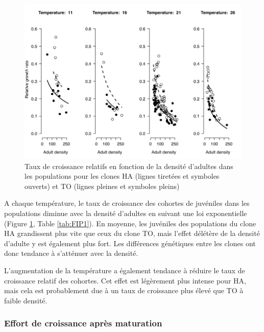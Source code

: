 \begin{figure}[!ht]
\begin{center}
\includegraphics[width=\textwidth]{1_CorpsDeThese/Resumes/Fig/FIP04}
\caption[Taux de croissance
relatifs]{Taux de croissance relatifs en fonction de la densité d'adultes dans
les populations pour les clones HA (lignes tiretées et symboles ouverts) et TO
(lignes pleines et symboles pleins)}
\label{fig:FIP4}
\end{center}
\end{figure}

A chaque température, le taux de croissance des cohortes de juvéniles dans les
populations diminue avec la densité d'adultes en suivant une loi exponentielle
(Figure \ref{fig:FIP4}, Table \ref{tab:FIP1}). En moyenne, les juvéniles des
populations du clone HA grandissent plus vite que ceux du clone TO, mais l'effet
délétère de la densité d'adulte y est également plus fort. Les différences
génétiques entre les clones ont donc tendance à s'atténuer avec la densité. 

L'augmentation de la température a également tendance à réduire le taux de
croissance relatif des cohortes. Cet effet est légèrement plus intense pour HA,
mais cela est probablement due à un taux de croissance plus élevé que TO à
faible densité. 

\subsubsection{Effort de croissance après maturation}

